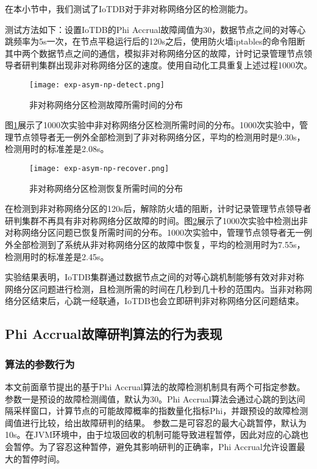 在本小节中，我们测试了IoTDB对于非对称网络分区的检测能力。

测试方法如下：设置IoTDB的Phi Accrual故障阈值为30，数据节点之间的对等心跳频率为5s一次，在节点平稳运行后的120s之后，使用防火墙iptables的命令阻断其中两个数据节点之间的通信，模拟非对称网络分区的故障，计时记录管理节点领导者研判集群出现非对称网络分区的速度。使用自动化工具重复上述过程1000次。

\begin{figure}
    \centering
    \texttt{[image: exp-asym-np-detect.png]}
    \caption{非对称网络分区检测故障所需时间的分布}
    \label{fig:exp-asym-np-detect}
\end{figure}

图\ref{fig:exp-asym-np-detect}展示了1000次实验中非对称网络分区检测所需时间的分布。1000次实验中，管理节点领导者无一例外全部检测到了非对称网络分区，平均的检测用时是9.30s，检测用时的标准差是2.08s。

\begin{figure}
    \centering
    \texttt{[image: exp-asym-np-recover.png]}
    \caption{非对称网络分区检测恢复所需时间的分布}
    \label{fig:exp-asym-np-recover}
\end{figure}

在检测到非对称网络分区的120s后，解除防火墙的阻断，计时记录管理节点领导者研判集群不再具有非对称网络分区故障的时间。图\ref{fig:exp-asym-np-recover}展示了1000次实验中检测出非对称网络分区问题已恢复所需时间的分布。1000次实验中，管理节点领导者无一例外全部检测到了系统从非对称网络分区的故障中恢复，平均的检测用时为7.55s，检测用时的标准差是2.45s。

实验结果表明，IoTDB集群通过数据节点之间的对等心跳机制能够有效对非对称网络分区问题进行检测，且检测所需的时间在几秒到几十秒的范围内。当非对称网络分区结束后，心跳一经联通，IoTDB也会立即研判非对称网络分区问题结束。


\subsection{Phi Accrual故障研判算法的行为表现}\label{sec-experience-phi-accrual}

\subsubsection{算法的参数行为}

本文前面章节提出的基于Phi Accrual算法的故障检测机制具有两个可指定参数。
参数一是预设的故障检测阈值，默认为30。Phi Accrual算法会通过心跳的到达间隔采样窗口，计算节点的可能故障概率的指数量化指标Phi，并跟预设的故障检测阈值进行比较，给出故障研判的结果。
参数二是可容忍的最大心跳暂停，默认为10s。在JVM环境中，由于垃圾回收的机制可能导致进程暂停，因此对应的心跳也会暂停。为了容忍这种暂停，避免其影响研判的正确率，Phi Accrual允许设置最大的暂停时间。

